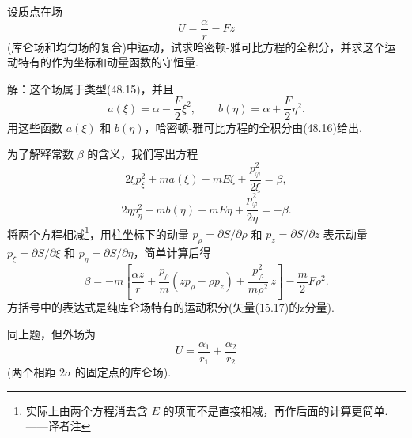 \begin{xiti}

\quad 设质点在场
\begin{equation*}
  U=\frac{\alpha}{r}-Fz
\end{equation*}
(库仑场和均匀场的复合)中运动，试求哈密顿-雅可比方程的全积分，并求这个运动特有的作为坐标和动量函数的守恒量.

解：这个场属于类型(48.15)，并且
\begin{equation*}
  a(\xi)=\alpha-\frac{F}{2}\xi^2,\qquad
  b(\eta)=\alpha+\frac{F}{2}\eta^2.
\end{equation*}
用这些函数 $a(\xi)$ 和 $b(\eta)$，哈密顿-雅可比方程的全积分由(48.16)给出.

为了解释常数 $\beta$ 的含义，我们写出方程
\begin{equation*}
  2\xi p_\xi^2+ma(\xi)-mE\xi+\frac{p_\varphi^2}{2\xi}=\beta,
\end{equation*}
\begin{equation*}
  2\eta p_\eta^2+mb(\eta)-mE\eta+\frac{p_\varphi^2}{2\eta}=-\beta.
\end{equation*}
将两个方程相减\footnote{实际上由两个方程消去含 $E$ 的项而不是直接相减，再作后面的计算更简单.——译者注}，用柱坐标下的动量 $p_\rho=\partial S/\partial\rho$ 和
$p_z=\partial S/\partial z$ 表示动量 $p_\xi=\partial S/\partial\xi$ 和
$p_\eta=\partial S/\partial\eta$，简单计算后得
\begin{equation*}
  \beta=-m\left[\frac{\alpha z}{r}
  +\frac{p_\rho}{m}\left(zp_\rho-\rho p_z\right)
  +\frac{p_\varphi^2}{m\rho^2}\,z\right]-\frac{m}{2}F\rho^2.
\end{equation*}
方括号中的表达式是纯库仑场特有的运动积分(矢量(15.17)的z分量).

\quad 同上题，但外场为
\begin{equation*}
  U=\frac{\alpha_1}{r_1}+\frac{\alpha_2}{r_2}
\end{equation*}
(两个相距 $2\sigma$ 的固定点的库仑场).


\end{xiti}
